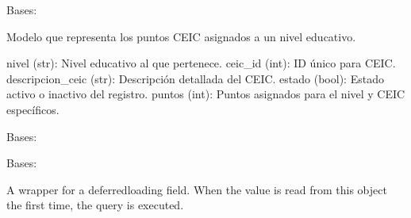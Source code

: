 \documentclass[letterpaper,10pt,spanish]{sphinxmanual}
\begin{document}
\begin{fulllineitems}

\pysigstartsignatures
{}
\pysigstopsignatures
\sphinxAtStartPar
Bases: 

\sphinxAtStartPar
Modelo que representa los puntos CEIC asignados a un nivel educativo.
\begin{description}
\sphinxAtStartPar
nivel (str): Nivel educativo al que pertenece.
ceic\_id (int): ID único para CEIC.
descripcion\_ceic (str): Descripción detallada del CEIC.
estado (bool): Estado activo o inactivo del registro.
puntos (int): Puntos asignados para el nivel y CEIC específicos.

\end{description}


\begin{fulllineitems}

\pysigstartsignatures
{}
\pysigstopsignatures
\sphinxAtStartPar
Bases: 

\end{fulllineitems}



\begin{fulllineitems}

\pysigstartsignatures
{}
\pysigstopsignatures
\sphinxAtStartPar
Bases: 

\end{fulllineitems}



\begin{fulllineitems}

\pysigstartsignatures
{}
\pysigstopsignatures
\sphinxAtStartPar
A wrapper for a deferred\sphinxhyphen{}loading field. When the value is read from this
object the first time, the query is executed.

\end{fulllineitems}




\end{fulllineitems}
\end{document}
